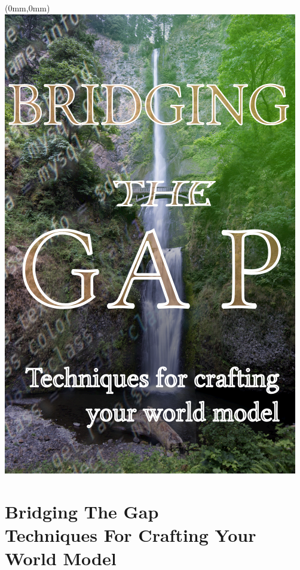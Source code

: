 \documentclass[10pt,openany,final]{memoir}
\begin{document}
\chapter*{}
\begin{textblock*}{70.9mm}(0mm,0mm)
\includegraphics[width=\paperwidth]{./media/images/bridging_the_gap.png}
\end{textblock*}
\chapter{Bridging The Gap \\ \small{Techniques For Crafting Your World Model}}

\end{document}
